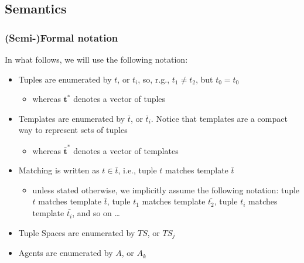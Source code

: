 \documentclass[presentation]{beamer}\mode<presentation>{\usetheme{AMSCesenaPurpleAndGold}}
\begin{document}
\subsection{Semantics} 

\begin{frame}%
\frametitle{(Semi-)Formal notation}

	In what follows, we will use the following notation:
	\vfill
	\begin{itemize}
		\item Tuples are enumerated by \alert{$t$}, or $t_i$, so, r.g., $t_1 \neq t_2$, but $t_0 = t_0$
		\begin{itemize}
			\item whereas $\mathbf{t}^*$ denotes a vector of tuples
		\end{itemize}
		
		\vfill
		
		\item Templates are enumerated by \alert{$\bar{t}$}, or $\bar{t}_i$. Notice that templates are a compact way to represent \alert{sets} of tuples
		\begin{itemize}
			\item whereas $\bar{\mathbf{t}}^*$ denotes a vector of templates
		\end{itemize}
		
		\vfill
		
		\item Matching is written as \alert{$t \in \bar{t}$}, i.e., tuple $t$ matches template $\bar{t}$
		\begin{itemize}
			\item unless stated otherwise, we implicitly assume the following notation: tuple $t$ matches template $\bar{t}$, tuple $t_1$ matches template $\bar{t_2}$, tuple $t_i$ matches template $\bar{t_i}$, and so on \ldots
		\end{itemize}
		
		\vfill
		
		\item Tuple Spaces are enumerated by \alert{$TS$}, or $TS_j$
		
		\vfill
		
		\item Agents are enumerated by \alert{$A$}, or $A_k$
	\end{itemize}

\end{frame}
\end{document}
